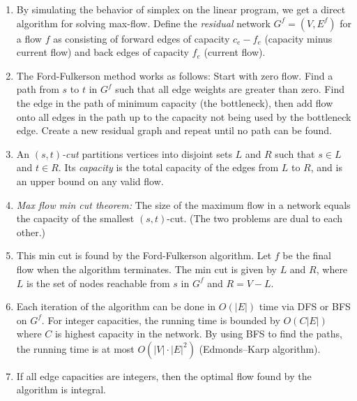 \documentclass[10pt]{article}
\begin{document}
\begin{multicols}{2}
\begin{addmargin}[0.8em]{0.5em}
\begin{enumerate}[label=(\alph*)]
        \item By simulating the behavior of simplex on the linear program, we get a direct algorithm for solving max-flow. Define the \textit{residual} network $G^f=(V,E^f)$ for a flow $f$ as consisting of forward edges of capacity $c_e - f_e$ (capacity minus current flow) and back edges of capacity $f_e$ (current flow). 
        
        \item The Ford-Fulkerson method works as follows: Start with zero flow. Find a path from $s$ to $t$ in $G^f$ such that all edge weights are greater than zero. Find the edge in the path of minimum capacity (the bottleneck), then add flow onto all edges in the path up to the capacity not being used by the bottleneck edge. Create a new residual graph and repeat until no path can be found. 
        \item An \textit{$(s,t)$-cut} partitions vertices into disjoint sets $L$ and $R$ such that $s \in L$ and $t \in R$. Its \textit{capacity} is the total capacity of the edges from $L$ to $R$, and is an upper bound on any valid flow. 
        \item \textit{Max flow min cut theorem:} The size of the maximum flow in a network equals the capacity of the smallest $(s, t)$-cut. (The two problems are dual to each other.)
        \item This min cut is found by the Ford-Fulkerson algorithm. Let $f$ be the final flow when the algorithm terminates. The min cut is given by $L$ and $R$, where $L$ is the set of nodes reachable from $s$ in $G^f$ and $R = V - L$. 
    
        \item Each iteration of the algorithm can be done in $O(|E|)$ time via DFS or BFS on $G^f$. For integer capacities, the running time is bounded by $O(C|E|)$ where $C$ is highest capacity in the network. By using BFS to find the paths, the running time is at most $O(|V| \cdot |E|^2)$ (Edmonds–Karp algorithm).
        
        \item If all edge capacities are integers, then the optimal flow found by the algorithm is integral.
        

\end{enumerate}
\end{addmargin}
\end{multicols}
\end{document}
